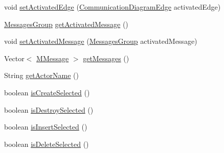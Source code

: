 \begin{DoxyCompactItemize}
\item 
void \hyperlink{classorg_1_1tzi_1_1use_1_1gui_1_1views_1_1diagrams_1_1behavior_1_1communicationdiagram_1_1_communication_diagram_af3a61b0c125bfd139b7a9033ca1638fe}{set\-Activated\-Edge} (\hyperlink{classorg_1_1tzi_1_1use_1_1gui_1_1views_1_1diagrams_1_1behavior_1_1communicationdiagram_1_1_communication_diagram_edge}{Communication\-Diagram\-Edge} activated\-Edge)
\item 
\hyperlink{classorg_1_1tzi_1_1use_1_1gui_1_1views_1_1diagrams_1_1behavior_1_1communicationdiagram_1_1_messages_group}{Messages\-Group} \hyperlink{classorg_1_1tzi_1_1use_1_1gui_1_1views_1_1diagrams_1_1behavior_1_1communicationdiagram_1_1_communication_diagram_a6a6c8e00b49d052893296b8a0d624ebb}{get\-Activated\-Message} ()
\item 
void \hyperlink{classorg_1_1tzi_1_1use_1_1gui_1_1views_1_1diagrams_1_1behavior_1_1communicationdiagram_1_1_communication_diagram_ad5e68046861ca9bbd31fb56224256333}{set\-Activated\-Message} (\hyperlink{classorg_1_1tzi_1_1use_1_1gui_1_1views_1_1diagrams_1_1behavior_1_1communicationdiagram_1_1_messages_group}{Messages\-Group} activated\-Message)
\item 
Vector$<$ \hyperlink{classorg_1_1tzi_1_1use_1_1gui_1_1views_1_1diagrams_1_1behavior_1_1communicationdiagram_1_1_m_message}{M\-Message} $>$ \hyperlink{classorg_1_1tzi_1_1use_1_1gui_1_1views_1_1diagrams_1_1behavior_1_1communicationdiagram_1_1_communication_diagram_a9bbe7dd03f732c59d1b44c3a34f55213}{get\-Messages} ()
\item 
String \hyperlink{classorg_1_1tzi_1_1use_1_1gui_1_1views_1_1diagrams_1_1behavior_1_1communicationdiagram_1_1_communication_diagram_a109a8bdf0a1bdd1ff32b8e03d11842b2}{get\-Actor\-Name} ()
\item 
boolean \hyperlink{classorg_1_1tzi_1_1use_1_1gui_1_1views_1_1diagrams_1_1behavior_1_1communicationdiagram_1_1_communication_diagram_a986d3590965f2b8739eeb9389ddf6aa1}{is\-Create\-Selected} ()
\item 
boolean \hyperlink{classorg_1_1tzi_1_1use_1_1gui_1_1views_1_1diagrams_1_1behavior_1_1communicationdiagram_1_1_communication_diagram_a437062522eed5c8ee9f16855ad5d5feb}{is\-Destroy\-Selected} ()
\item 
boolean \hyperlink{classorg_1_1tzi_1_1use_1_1gui_1_1views_1_1diagrams_1_1behavior_1_1communicationdiagram_1_1_communication_diagram_a63b1557c7f0825e53636c500e596cd26}{is\-Insert\-Selected} ()
\item 
boolean \hyperlink{classorg_1_1tzi_1_1use_1_1gui_1_1views_1_1diagrams_1_1behavior_1_1communicationdiagram_1_1_communication_diagram_a618f58aff2dd7d3c48c13a92c90954c2}{is\-Delete\-Selected} ()

\end{DoxyCompactItemize}
